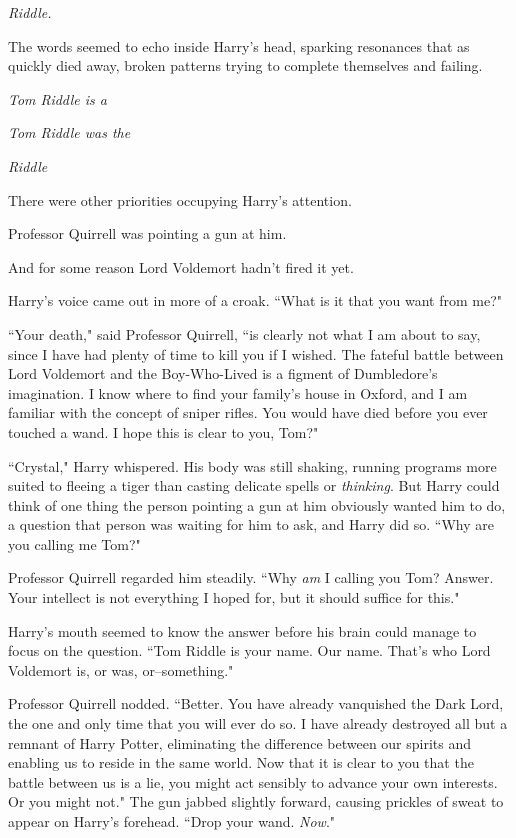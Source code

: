 
\emph{ Riddle.}

\hplettrineextrapara
The words seemed to echo inside Harry's head, sparking resonances that as quickly died away, broken patterns trying to complete themselves and failing.

\emph{Tom Riddle is a}

\emph{Tom Riddle was the}

\emph{Riddle}

There were other priorities occupying Harry's attention.

Professor Quirrell was pointing a gun at him.

And for some reason Lord Voldemort hadn't fired it yet.

Harry's voice came out in more of a croak. ``What is it that you want from me?"

``Your death," said Professor Quirrell, ``is clearly not what I am about to say, since I have had plenty of time to kill you if I wished. The fateful battle between Lord Voldemort and the Boy-Who-Lived is a figment of Dumbledore's imagination. I know where to find your family's house in Oxford, and I am familiar with the concept of sniper rifles. You would have died before you ever touched a wand. I hope this is clear to you, Tom?"

``Crystal," Harry whispered. His body was still shaking, running programs more suited to fleeing a tiger than casting delicate spells or \emph{thinking}. But Harry could think of one thing the person pointing a gun at him obviously wanted him to do, a question that person was waiting for him to ask, and Harry did so. ``Why are you calling me Tom?"

Professor Quirrell regarded him steadily. ``Why \emph{am} I calling you Tom? Answer. Your intellect is not everything I hoped for, but it should suffice for this."

Harry's mouth seemed to know the answer before his brain could manage to focus on the question. ``Tom Riddle is your name. Our name. That's who Lord Voldemort is, or was, or\---something."

Professor Quirrell nodded. ``Better. You have already vanquished the Dark Lord, the one and only time that you will ever do so. I have already destroyed all but a remnant of Harry Potter, eliminating the difference between our spirits and enabling us to reside in the same world. Now that it is clear to you that the battle between us is a lie, you might act sensibly to advance your own interests. Or you might not." The gun jabbed slightly forward, causing prickles of sweat to appear on Harry's forehead. ``Drop your wand. \emph{Now}."

